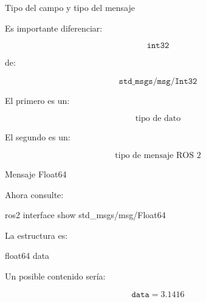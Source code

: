 \documentclass[aspectratio=169]{beamer}
\begin{document}
\begin{frame}{Tipo del campo y tipo del mensaje}

    Es importante diferenciar:

    \[
    \boxed{\texttt{int32}}
    \]

    de:

    \[
    \boxed{\texttt{std\_msgs/msg/Int32}}
    \]

    El primero es un:

    \[
    \text{tipo de dato}
    \]

    El segundo es un:

    \[
    \text{tipo de mensaje ROS 2}
    \]

    \vspace{-0.3cm}


\end{frame}

\begin{frame}[fragile]{Mensaje Float64}

    Ahora consulte:

    \begin{bashcodedark}
        ros2 interface show std_msgs/msg/Float64
    \end{bashcodedark}

    La estructura es:

    \begin{consolecodedark}
        float64 data
    \end{consolecodedark}

    \vspace{0.3cm}

    Un posible contenido sería:

    \[
    \texttt{data}=3.1416
    \]


\end{frame}
\end{document}
